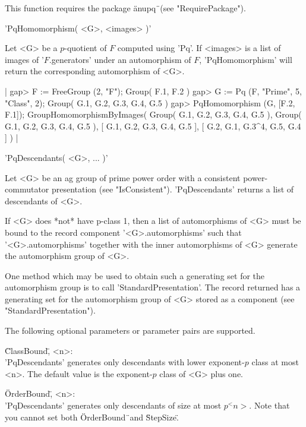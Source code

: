 This function requires the package \"anupq\"\ (see "RequirePackage").


'PqHomomorphism( <G>, <images> )'

Let <G> be a $p$-quotient of $F$ computed  using  'Pq'. If <images>  is a
list  of  images  of  '$F$.generators'  under  an  automorphism  of  $F$,
'PqHomomorphism' will return the corresponding automorphism of <G>.

|    gap> F := FreeGroup (2, "F");
    Group( F.1, F.2 )
    gap> G := Pq (F, "Prime", 5, "Class", 2);
    Group( G.1, G.2, G.3, G.4, G.5 )
    gap> PqHomomorphism (G, [F.2, F.1]);
    GroupHomomorphismByImages( Group( G.1, G.2, G.3, G.4, G.5 ), Group(
    G.1, G.2, G.3, G.4, G.5 ), [ G.1, G.2, G.3, G.4, G.5 ],
    [ G.2, G.1, G.3^4, G.5, G.4 ] ) |


'PqDescendants( <G>, ... )'

Let  <G>  be  an  ag  group  of  prime  power  order  with  a  consistent
power-commutator  presentation   (see  "IsConsistent").   'PqDescendants'
returns a list of descendants of <G>.

If <G>  does  *not* have p-class 1,  then a list of  automorphisms of <G>
must  be  bound  to the  record  component '<G>.automorphisms' such  that
'<G>.automorphisms' together with the inner automorphisms of <G> generate
the automorphism group of <G>.

One method  which  may be  used  to obtain such a generating set  for the
automorphism  group  is  to  call  'StandardPresentation'.   The record
returned has a generating set for the automorphism group of <G> stored as
a component (see "StandardPresentation").

The following optional parameters or parameter pairs are supported.

\"ClassBound\", <n>: \\
    'PqDescendants' generates  only  descendants  with lower exponent-$p$
    class  at most  <n>.  The default value is  the exponent-$p$ class of
    <G> plus one.

\"OrderBound\", <n>: \\
    'PqDescendants' generates only descendants of  size at  most $p^<n>$.
    Note that you cannot set both \"OrderBound\"\ and \"StepSize\".

